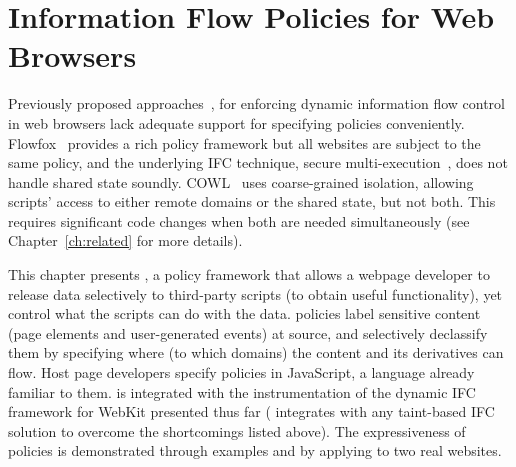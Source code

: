 \chapter{Information Flow Policies for Web Browsers}
\label{ch:webpol}

Previously proposed approaches~\cite{jsflow,post14,csf15,chudnov-ccs}, 
for enforcing dynamic information flow control in web
browsers lack adequate support for specifying policies
conveniently. Flowfox~\cite{csf14} provides a rich policy framework
but all websites are subject to the same policy, and the underlying IFC
technique, secure multi-execution~\cite{SME}, does not handle shared
state soundly. COWL~\cite{cowl} uses coarse-grained isolation,
allowing scripts' access to either remote domains or the shared state,
but not both. This requires significant code changes when both are
needed simultaneously (see Chapter~\ref{ch:related} for more
details).

This chapter presents {\sys}, a policy framework that allows
a webpage developer to release data selectively to third-party scripts
(to obtain useful functionality), yet control what the scripts can do
with the data. {\sys} policies label
sensitive content (page elements and user-generated events) at source,
and selectively declassify them by specifying where (to which domains)
the content and its derivatives can flow. Host page developers specify
{\sys} policies in JavaScript, a language already familiar to them. 
{\sys} is integrated with the instrumentation of the dynamic IFC
framework for WebKit presented thus far ({\sys} integrates with any
taint-based IFC solution to overcome the shortcomings listed
above). The expressiveness of {\sys} policies is demonstrated through
examples and by applying {\sys} to two real websites. 




